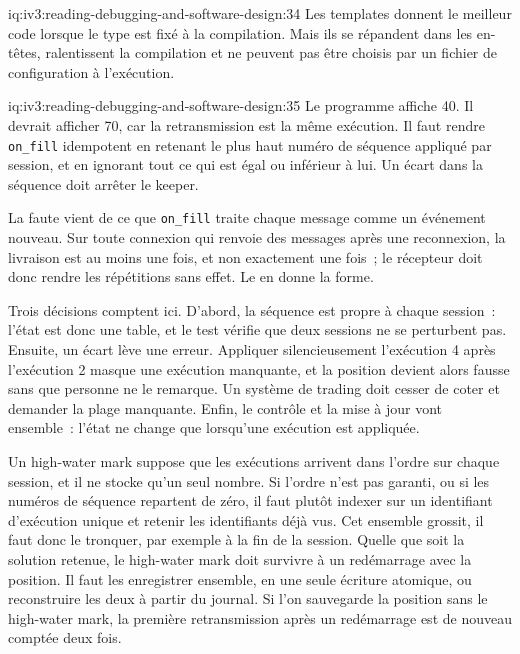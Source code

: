 \begin{solution}{iq:iv3:reading-debugging-and-software-design:34}
Les templates donnent le meilleur code lorsque le type est fixé à la compilation. Mais ils se répandent dans les en-têtes, ralentissent la compilation et ne peuvent pas être choisis par un fichier de configuration à l'exécution.


\end{solution}

\begin{solution}{iq:iv3:reading-debugging-and-software-design:35}
Le programme affiche 40. Il devrait afficher 70, car la retransmission est la même exécution. Il faut rendre \texttt{on\_fill} idempotent en retenant le plus haut numéro de séquence appliqué par session, et en ignorant tout ce qui est égal ou inférieur à lui. Un écart dans la séquence doit arrêter le keeper.

La faute vient de ce que \texttt{on\_fill} traite chaque message comme un événement nouveau. Sur toute connexion qui renvoie des messages après une reconnexion, la livraison est au moins une fois, et non exactement une fois~; le récepteur doit donc rendre les répétitions sans effet. Le  en donne la forme.

\enlargethispage{-3\baselineskip}%
\label{lst:iv3:rd:replayfixed}

Trois décisions comptent ici. D'abord, la séquence est propre à chaque session~: l'état est donc une table, et le test vérifie que deux sessions ne se perturbent pas. Ensuite, un écart lève une erreur. Appliquer silencieusement l'exécution 4 après l'exécution 2 masque une exécution manquante, et la position devient alors fausse sans que personne ne le remarque. Un système de trading doit cesser de coter et demander la plage manquante. Enfin, le contrôle et la mise à jour vont ensemble~: l'état ne change que lorsqu'une exécution est appliquée.

Un high-water mark suppose que les exécutions arrivent dans l'ordre sur chaque session, et il ne stocke qu'un seul nombre. Si l'ordre n'est pas garanti, ou si les numéros de séquence repartent de zéro, il faut plutôt indexer sur un identifiant d'exécution unique et retenir les identifiants déjà vus. Cet ensemble grossit, il faut donc le tronquer, par exemple à la fin de la session. Quelle que soit la solution retenue, le high-water mark doit survivre à un redémarrage avec la position. Il faut les enregistrer ensemble, en une seule écriture atomique, ou reconstruire les deux à partir du journal. Si l'on sauvegarde la position sans le high-water mark, la première retransmission après un redémarrage est de nouveau comptée deux fois.


\end{solution}
